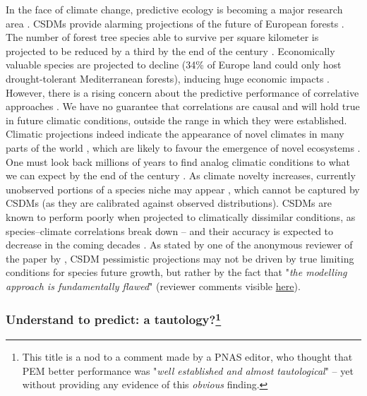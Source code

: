 In the face of climate change, predictive ecology is becoming a major research area \citep{Houlahan2017, Mouquet2015}. CSDMs provide alarming projections of the future of European forests \citep{Thurm2018, Dyderski2018, Chakraborty2021, Wessely2024, Mauri2022}. The number of forest tree species able to survive per square kilometer is projected to be reduced by a third by the end of the century \citep{Wessely2024}. Economically valuable species are projected to decline (34\% of Europe land could only host drought-tolerant Mediterranean forests), inducing huge economic impacts \citep{Hanewinkel2013}. However, there is a rising concern about the predictive performance of correlative approaches \citep{Bahn2007, Journe2020}. We have no guarantee that correlations are causal and will hold true in future climatic conditions, outside the range in which they were established. Climatic projections indeed indicate the appearance of novel climates in many parts of the world \citep{Williams2007, Mahony2017}, which are likely to favour the emergence of novel ecosystems \citep{Burke2019}. One must look back millions of years to find analog climatic conditions to what we can expect by the end of the century \citep{Burke2018}. As climate novelty increases, currently unobserved portions of a species niche may appear \citep{Chevalier2024}, which cannot be captured by CSDMs (as they are calibrated against observed distributions). CSDMs are known to perform poorly when projected to climatically dissimilar conditions, as species–climate correlations break down \citep{Maguire2016} -- and their accuracy is expected to decrease in the coming decades \citep{Fitzpatrick2018}. As stated by one of the anonymous reviewer of the paper by \citet{Wessely2024}, CSDM pessimistic projections may not be driven by true limiting conditions for species future growth, but rather by the fact that "\emph{the modelling approach is fundamentally flawed}" (reviewer comments visible \href{https://static-content.springer.com/esm/art%3A10.1038%2Fs41559-024-02406-8/MediaObjects/41559_2024_2406_MOESM3_ESM.pdf}{here}).

\subsubsection[Understand to predict: a tautology?]{Understand to predict: a tautology?\footnote{This title is a nod to a comment made by a PNAS editor, who thought that PEM better performance was "\emph{well established and almost tautological}" -- yet without providing any evidence of this \emph{obvious} finding.}} \label{sec:tautology}

